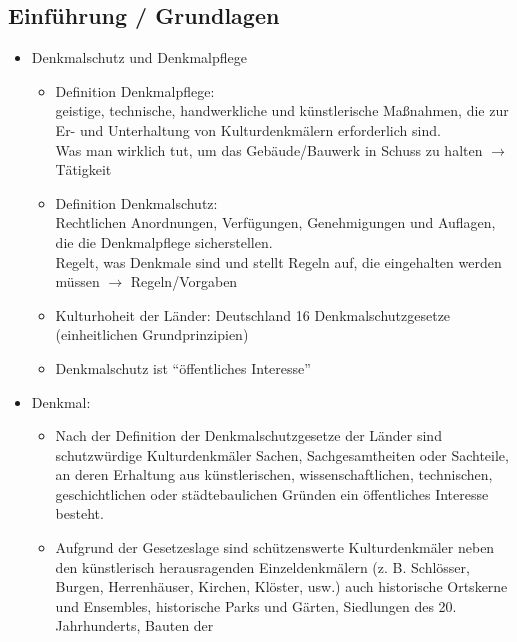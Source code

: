 \documentclass[fleqn,twoside,dvipsnames]{article}
\begin{document}
    \subsection{Einführung / Grundlagen}
        \begin{itemize}
            \item Denkmalschutz und Denkmalpflege
                \begin{itemize}
                    \item Definition Denkmalpflege:\\
                    geistige, technische, handwerkliche und künstlerische Maßnahmen, die zur Er- und Unterhaltung von Kulturdenkmälern erforderlich sind.\\
                    Was man wirklich tut, um das Gebäude/Bauwerk in Schuss zu halten $\rightarrow$ Tätigkeit
                    \item Definition Denkmalschutz:\\
                    Rechtlichen Anordnungen, Verfügungen, Genehmigungen und Auflagen, die die Denkmalpflege sicherstellen.\\
                    Regelt, was Denkmale sind und stellt Regeln auf, die eingehalten werden müssen $\rightarrow$ Regeln/Vorgaben
                    \item Kulturhoheit der Länder: Deutschland 16 Denkmalschutzgesetze (einheitlichen Grundprinzipien)
                    \item Denkmalschutz ist \enquote{öffentliches Interesse}
                \end{itemize}
            \item Denkmal:
                \begin{itemize}
                    \item Nach der Definition der Denkmalschutzgesetze der Länder sind schutzwürdige
                        Kulturdenkmäler Sachen, Sachgesamtheiten oder Sachteile, an deren Erhaltung
                        aus künstlerischen, wissenschaftlichen, technischen, geschichtlichen oder
                        städtebaulichen Gründen ein öffentliches Interesse besteht.
                    \item Aufgrund der Gesetzeslage sind schützenswerte Kulturdenkmäler neben den
                        künstlerisch herausragenden Einzeldenkmälern (z. B. Schlösser, Burgen,
                        Herrenhäuser, Kirchen, Klöster, usw.) auch historische Ortskerne und Ensembles,
                        historische Parks und Gärten, Siedlungen des 20. Jahrhunderts, Bauten der

\end{itemize}
\end{itemize}
\end{document}
